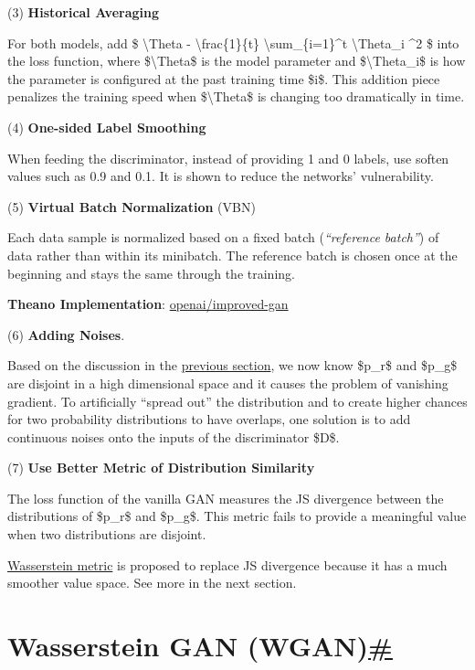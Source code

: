 (3) \textbf{Historical Averaging}

For both models, add \$ \textbar{} \textbackslash Theta - \textbackslash frac\{1\}\{t\} \textbackslash sum\_\{i=1\}\^{}t \textbackslash Theta\_i \textbar\^{}2 \$ into the loss function, where \$\textbackslash Theta\$ is the model parameter and \$\textbackslash Theta\_i\$ is how the parameter is configured at the past training time \$i\$. This addition piece penalizes the training speed when \$\textbackslash Theta\$ is changing too dramatically in time.

(4) \textbf{One-sided Label Smoothing}

When feeding the discriminator, instead of providing 1 and 0 labels, use soften values such as 0.9 and 0.1. It is shown to reduce the networks' vulnerability.

(5) \textbf{Virtual Batch Normalization} (VBN)

Each data sample is normalized based on a fixed batch (\emph{``reference batch''}) of data rather than within its minibatch. The reference batch is chosen once at the beginning and stays the same through the training.

\textbf{Theano Implementation}: \href{https://github.com/openai/improved-gan}{openai/improved-gan}

(6) \textbf{Adding Noises}.

Based on the discussion in the \href{https://lilianweng.github.io/posts/2017-08-20-gan/\#low-dimensional-supports}{previous section}, we now know \$p\_r\$ and \$p\_g\$ are disjoint in a high dimensional space and it causes the problem of vanishing gradient. To artificially ``spread out'' the distribution and to create higher chances for two probability distributions to have overlaps, one solution is to add continuous noises onto the inputs of the discriminator \$D\$.

(7) \textbf{Use Better Metric of Distribution Similarity}

The loss function of the vanilla GAN measures the JS divergence between the distributions of \$p\_r\$ and \$p\_g\$. This metric fails to provide a meaningful value when two distributions are disjoint.

\href{https://en.wikipedia.org/wiki/Wasserstein_metric}{Wasserstein metric} is proposed to replace JS divergence because it has a much smoother value space. See more in the next section.

\section{\texorpdfstring{Wasserstein GAN (WGAN)\hyperref[wasserstein-gan-wgan]{\#}}{Wasserstein GAN (WGAN)\#}}\label{wasserstein-gan-wgan}

